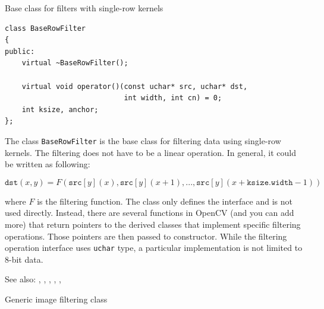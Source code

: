 \label{BaseRowFilter}
Base class for filters with single-row kernels

\begin{lstlisting}
class BaseRowFilter
{
public:
    virtual ~BaseRowFilter();
    
    virtual void operator()(const uchar* src, uchar* dst,
                            int width, int cn) = 0;
    int ksize, anchor;
};
\end{lstlisting}

The class \texttt{BaseRowFilter} is the base class for filtering data using single-row kernels. The filtering does not have to be a linear operation. In general, it could be written as following:

\[\texttt{dst}(x,y) = F(\texttt{src}[y](x), \texttt{src}[y](x+1), ..., \texttt{src}[y](x+\texttt{ksize.width}-1))\]

where $F$ is the filtering function. The class only defines the interface and is not used directly. Instead, there are several functions in OpenCV (and you can add more) that return pointers to the derived classes that implement specific filtering operations. Those pointers are then passed to  constructor. While the filtering operation interface uses \texttt{uchar} type, a particular implementation is not limited to 8-bit data.

See also: , , ,
 , , 

\label{FilterEngine}
Generic image filtering class

